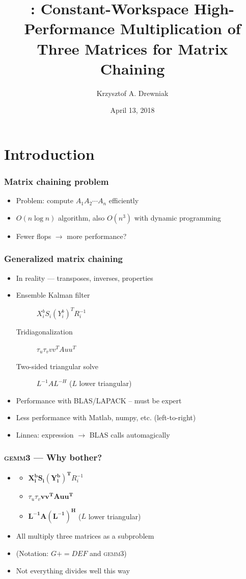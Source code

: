 \documentclass{beamer}
\title[\gemmt{}]{\gemmt{}: Constant-Workspace High-Performance Multiplication of Three Matrices for Matrix Chaining}
\author[Drewniak]{Krzysztof A. Drewniak}
\institute[UT Austin]{The University of Texas at Austin}
\date[]{April 13, 2018}
\newcommand*{\pluseq}{\mathrel{{+}{=}}}
\newcommand*{\gemmt}{{\textsc{gemm3}}}
\begin{document}
\begin{frame}[plain]
  \titlepage{}
\end{frame}

\section[Introduction]{Introduction}
\begin{frame}
  \frametitle{Matrix chaining problem}
  \begin{itemize}
  \item Problem: compute $A_1A_2\cdots A_n$ efficiently
  \item $O(n \log n)$ algorithm, also $O(n^3)$ with dynamic programming
  \item Fewer flops $\to$ more performance?
  \end{itemize}
\end{frame}

\begin{frame}
  \frametitle{Generalized matrix chaining}
  \begin{itemize}
  \item In reality --- transposes, inverses, properties
  \item
    \begin{description}
    \item[Ensemble Kalman filter] $X_i^b S_i (Y_i^b)^T R_i^{-1}$
    \item[Tridiagonalization] $\tau_u\tau_vvv^TAuu^T$
    \item[Two-sided triangular solve] $L^{-1}AL^{-H}$ ($L$ lower triangular)
    \end{description}
  \item Performance with BLAS/LAPACK -- must be expert
  \item Less performance with  Matlab, numpy, etc. (left-to-right)
  \item Linnea: expression $\to$ BLAS calls automagically
  \end{itemize}
\end{frame}

\begin{frame}
  \frametitle{\gemmt{} --- Why bother?}
  \begin{itemize}
  \item
    \begin{itemize}
    \item $\bm{X_i^b S_i (Y_i^b)^T}R_i^{-1}$
    \item $\tau_u\tau_v \bm{vv^TAuu^T}$
    \item$\bm{L^{-1}A(L^{-1})^H}$ ($L$ lower triangular)
    \end{itemize}
  \item All multiply three matrices as a subproblem
  \item (Notation: $G \pluseq DEF$ and \gemmt{})
  \item Not everything divides well this way
  \end{itemize}
\end{frame}
\end{document}
